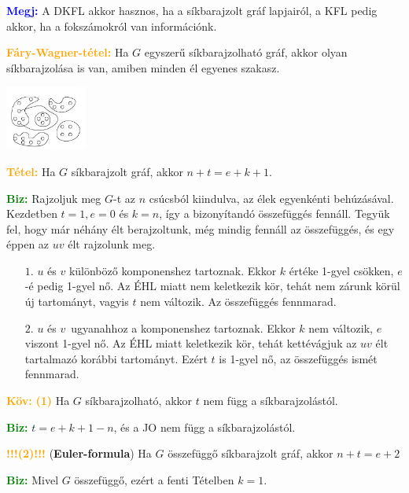 \documentclass[../../szobeli.tex]{subfiles}
\begin{document}
\begin{itemize}
            \textcolor{blue}{\textbf{Megj:}} A DKFL akkor hasznos, ha a síkbarajzolt gráf lapjairól, a KFL pedig akkor, ha a fokszámokról van információnk.

            \textcolor{orange}{\textbf{Fáry-Wagner-tétel:}} Ha $G$ egyszerű síkbarajzolható gráf, akkor olyan síkbarajzolása is van, amiben minden él egyenes szakasz.

            \includegraphics[width=0.2\textwidth]{./img/1.png}

            \textcolor{orange}{\textbf{Tétel:}} Ha $G$ síkbarajzolt gráf, akkor $n+t=e+k+1$. 

            \textcolor{green}{\textbf{Biz:}} Rajzoljuk meg $G$-t az $n$ csúcsból kiindulva, az élek egyenkénti behúzásával. Kezdetben $t=1, e=0$ és $k=n$, így a bizonyítandó összefüggés fennáll. Tegyük fel, hogy már néhány élt berajzoltunk, még mindig fennáll az összefüggés, és egy éppen az $uv$ élt rajzolunk meg. \begin{itemize}
                \item[$\boxed{1.}$] $u$ és $v$ különböző komponenshez tartoznak. Ekkor $k$ értéke 1-gyel csökken, $e$-é pedig 1-gyel nő. Az ÉHL miatt nem keletkezik kör, tehát nem zárunk körül új tartományt, vagyis $t$ nem változik. Az összefüggés fennmarad.
                \item[$\boxed{2.}$] $u$ és $v$ ugyanahhoz a komponenshez tartoznak. Ekkor $k$ nem változik, $e$ viszont 1-gyel nő. Az ÉHL miatt keletkezik kör, tehát kettévágjuk az $uv$ élt tartalmazó korábbi tartományt. Ezért $t$ is 1-gyel nő, az összefüggés ismét fennmarad. 
            \end{itemize}

            \textcolor{orange}{\textbf{Köv:}} \textcolor{orange}{\textbf{(1)}} Ha $G$ síkbarajzolható, akkor $t$ nem függ a síkbarajzolástól.

            \textcolor{green}{\textbf{Biz:}} $t = e + k + 1 - n$, és a JO nem függ a síkbarajzolástól. 

            \textcolor{orange}{\textbf{!!!(2)!!!}} (\textbf{Euler-formula}) Ha $G$ összefüggő síkbarajzolt gráf, akkor $n + t = e + 2$

            \textcolor{green}{\textbf{Biz:}} Mivel $G$ összefüggő, ezért a fenti Tételben $k = 1$. 


\end{itemize}
\end{document}
